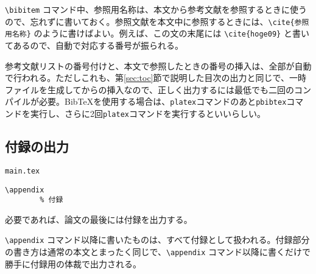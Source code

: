 \verb|\bibitem| コマンド中、参照用名称は、本文から参考文献を参照するときに使うので、忘れずに書いておく。参照文献を本文中に参照するときには、\verb|\cite{参照用名称}| のように書けばよい。例えば、この文の末尾には \verb|\cite{hoge09}| と書いてあるので、自動で対応する番号が振られる\cite{hoge09}\cite{hoge08}。

参考文献リストの番号付けと、本文で参照したときの番号の挿入は、全部が自動で行われる。ただしこれも、第\ref{sec:toc}節で説明した目次の出力と同じで、一時ファイルを生成してからの挿入なので、正しく出力するには最低でも二回のコンパイルが必要。BibTeXを使用する場合は、\verb|platex|コマンドのあと\verb|pbibtex|コマンドを実行し、さらに2回\verb|platex|コマンドを実行するといいらしい。



\subsection{付録の出力}

\begin{itembox}[l]{{\tt main.tex}}
\begin{verbatim}
\appendix
		% 付録
\end{verbatim}
\end{itembox}

必要であれば、論文の最後には付録を出力する。

\verb|\appendix| コマンド以降に書いたものは、すべて付録として扱われる。付録部分の書き方は通常の本文とまったく同じで、\verb|\appendix| コマンド以降に書くだけで勝手に付録用の体裁で出力される。
